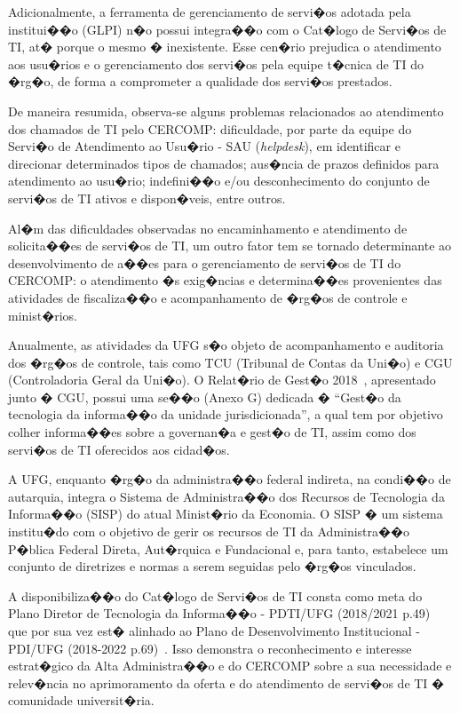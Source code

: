 Adicionalmente, a ferramenta de gerenciamento de servi�os adotada pela institui��o (GLPI) n�o possui integra��o com o Cat�logo de Servi�os de TI, at� porque o mesmo � inexistente. Esse cen�rio prejudica o atendimento aos usu�rios e o gerenciamento dos servi�os pela equipe t�cnica de TI do �rg�o, de forma a comprometer a qualidade dos servi�os prestados.

De maneira resumida, observa-se alguns problemas relacionados ao atendimento dos chamados de TI pelo CERCOMP: dificuldade, por parte da equipe do Servi�o de Atendimento ao Usu�rio - SAU (\textit{helpdesk}), em identificar e direcionar determinados tipos de chamados; aus�ncia de prazos definidos para atendimento ao usu�rio; indefini��o e/ou desconhecimento do conjunto de servi�os de TI ativos e dispon�veis, entre outros.

Al�m das dificuldades observadas no encaminhamento e atendimento de solicita��es de servi�os de TI, um outro fator tem se tornado determinante ao desenvolvimento de a��es para o gerenciamento de servi�os de TI do CERCOMP: o atendimento �s exig�ncias e determina��es provenientes das atividades de fiscaliza��o e acompanhamento de �rg�os de controle e minist�rios.

Anualmente, as atividades da UFG s�o objeto de acompanhamento e auditoria dos �rg�os de controle, tais como TCU (Tribunal de Contas da Uni�o) e CGU (Controladoria Geral da Uni�o). O Relat�rio de Gest�o 2018~\cite{RelatorioGestao2018}, apresentado junto � CGU, possui uma se��o (Anexo G) dedicada � ``Gest�o da tecnologia da informa��o da unidade jurisdicionada'', a qual tem por objetivo colher informa��es sobre a governan�a e gest�o de TI, assim como dos servi�os de TI oferecidos aos cidad�os.

A UFG, enquanto �rg�o da administra��o federal indireta, na condi��o de autarquia, integra o Sistema de Administra��o dos Recursos de Tecnologia da Informa��o (SISP) do atual Minist�rio da Economia. O SISP � um sistema institu�do com o objetivo de gerir os recursos de TI da Administra��o P�blica Federal Direta, Aut�rquica e Fundacional e, para tanto, estabelece um conjunto de diretrizes e normas a serem seguidas pelo �rg�os vinculados.

A disponibiliza��o do Cat�logo de Servi�os de TI consta como meta do Plano Diretor de Tecnologia da Informa��o - PDTI/UFG (2018/2021 p.49)~\cite{PDTI2018} que por sua vez est� alinhado ao Plano de Desenvolvimento Institucional - PDI/UFG (2018-2022 p.69)~\cite{PDI2018}. Isso demonstra o reconhecimento e interesse estrat�gico da Alta Administra��o e do CERCOMP sobre a sua necessidade e relev�ncia no aprimoramento da oferta e do atendimento de servi�os de TI � comunidade universit�ria.

